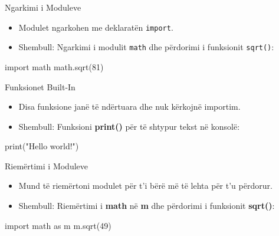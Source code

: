 \documentclass[
  ignorenonframetext,
]{beamer}
\newenvironment{Shaded}{\begin{snugshade}}{\end{snugshade}}
\newcommand{\BuiltInTok}[1]{#1}
\newcommand{\DecValTok}[1]{\textcolor[rgb]{0.00,0.00,0.81}{#1}}
\newcommand{\ImportTok}[1]{#1}
\newcommand{\NormalTok}[1]{#1}
\newcommand{\StringTok}[1]{\textcolor[rgb]{0.31,0.60,0.02}{#1}}
\begin{document}
\begin{frame}[fragile]{Ngarkimi i Moduleve}
\protect\hypertarget{ngarkimi-i-moduleve}{}
\begin{itemize}
\item
  Modulet ngarkohen me deklaratën \texttt{import}.
\item
  Shembull: Ngarkimi i modulit \texttt{math} dhe përdorimi i funksionit
  \texttt{sqrt()}:
\end{itemize}

\begin{Shaded}
\begin{Highlighting}[]
  \ImportTok{import}\NormalTok{ math}
\NormalTok{  math.sqrt(}\DecValTok{81}\NormalTok{)}
\end{Highlighting}
\end{Shaded}
\end{frame}

\begin{frame}[fragile]{Funksionet Built-In}
\protect\hypertarget{funksionet-built-in}{}
\begin{itemize}
\item
  Disa funksione janë të ndërtuara dhe nuk kërkojnë importim.
\item
  Shembull: Funksioni \textbf{print()} për të shtypur tekst në konsolë:
\end{itemize}

\begin{Shaded}
\begin{Highlighting}[]
\BuiltInTok{print}\NormalTok{(}\StringTok{"Hello world!"}\NormalTok{)}
\end{Highlighting}
\end{Shaded}
\end{frame}

\begin{frame}[fragile]{Riemërtimi i Moduleve}
\protect\hypertarget{riemuxebrtimi-i-moduleve}{}
\begin{itemize}
\item
  Mund të riemërtoni modulet për t'i bërë më të lehta për t'u përdorur.
\item
  Shembull: Riemërtimi i \textbf{math} në \textbf{m} dhe përdorimi i
  funksionit \textbf{sqrt()}:
\end{itemize}

\begin{Shaded}
\begin{Highlighting}[]
\ImportTok{import}\NormalTok{ math }\ImportTok{as}\NormalTok{ m}
\NormalTok{m.sqrt(}\DecValTok{49}\NormalTok{)}
\end{Highlighting}
\end{Shaded}
\end{frame}
\end{document}
